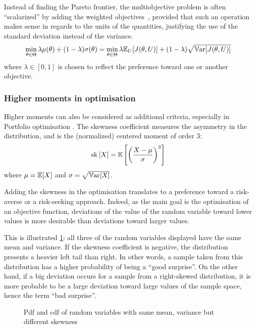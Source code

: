 \documentclass[../../Main_ManuscritThese.tex]{subfiles}
\newcommand\imgpath{/home/victor/acadwriting/Manuscrit/Text/Chapter3/img/}
\begin{document}
Instead of finding the Pareto frontier, the multiobjective problem is
often ``scalarized'' by adding the weighted
objectives~\cite{marler_weighted_2010}, provided that such an
operation makes sense in regards to the units of the quantities,
justifying the use of the standard deviation instead of the variance.
\begin{equation}
  \min_{\theta\in\Theta} \lambda \mu(\theta) + (1- \lambda)\sigma(\theta) =   \min_{\theta\in\Theta} \lambda \mathbb{E}_{U}[J(\theta,U)] + (1- \lambda)\sqrt{\mathbb{V}\mathrm{ar}[J(\theta,U)]}
\end{equation}
where $\lambda \in [0,1]$ is chosen to reflect the preference toward one or another objective.

\subsubsection{Higher moments in optimisation}
\label{sec:higher_moments}
Higher moments can also be considered as additional criteria,
especially in Portfolio optimisation
\cite{lai_mean-variance-skewness-kurtosis-based_2006,briec_mean-variance-skewness_2007}.
The skewness coefficient measures the asymmetry in the distribution,
and is the (normalized) centered moment of order $3$:
\begin{equation}
  \mathrm{sk}\left[X\right] = \mathbb{E}\left[\left(\frac{X - \mu}{\sigma}\right)^3\right]
\end{equation}
where $\mu = \mathbb{E}[X]$ and $\sigma = \sqrt{\mathbb{V}\mathrm{ar}[X]}$.

Adding the skewness in the optimisation translates to a preference
toward a risk-averse or a risk-seeking approach. Indeed, as the main
goal is the optimisation of an objective function, deviations of the
value of the random variable toward lower values is more desirable
than deviations toward larger values.

This is illustrated \cref{fig:skewness_example}: all three of the
random variables displayed have the same mean and variance.  If the
skewness coefficient is negative, the distribution presents a heavier
left tail than right. In other words, a sample taken from this
distribution has a higher probability of being a ``good surprise''. On
the other hand, if a big deviation occurs for a sample from a
right-skewed distribution, it is more probable to be a large deviation
toward large values of the sample space, hence the term ``bad
surprise''.

\begin{figure}[ht]
  \centering
  
  \caption[Influence of the skewness]{\label{fig:skewness_example} Pdf and cdf of random variables with same mean, variance but different skewness}
\end{figure}
\end{document}
